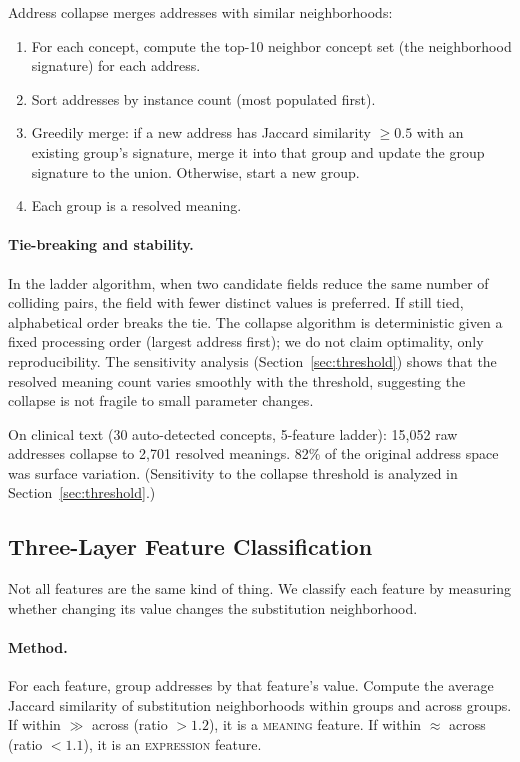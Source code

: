 \documentclass[11pt,a4paper]{article}
\begin{document}
Address collapse merges addresses with similar neighborhoods:

\begin{enumerate}
\item For each concept, compute the top-10 neighbor concept set (the neighborhood signature) for each address.
\item Sort addresses by instance count (most populated first).
\item Greedily merge: if a new address has Jaccard similarity $\geq 0.5$ with an existing group's signature, merge it into that group and update the group signature to the union. Otherwise, start a new group.
\item Each group is a resolved meaning.
\end{enumerate}

\paragraph{Tie-breaking and stability.} In the ladder algorithm, when two candidate fields reduce the same number of colliding pairs, the field with fewer distinct values is preferred. If still tied, alphabetical order breaks the tie. The collapse algorithm is deterministic given a fixed processing order (largest address first); we do not claim optimality, only reproducibility. The sensitivity analysis (Section~\ref{sec:threshold}) shows that the resolved meaning count varies smoothly with the threshold, suggesting the collapse is not fragile to small parameter changes.

On clinical text (30 auto-detected concepts, 5-feature ladder): 15,052 raw addresses collapse to 2,701 resolved meanings. 82\% of the original address space was surface variation. (Sensitivity to the collapse threshold is analyzed in Section~\ref{sec:threshold}.)

\subsection{Three-Layer Feature Classification}

Not all features are the same kind of thing. We classify each feature by measuring whether changing its value changes the substitution neighborhood.

\paragraph{Method.} For each feature, group addresses by that feature's value. Compute the average Jaccard similarity of substitution neighborhoods within groups and across groups. If within $\gg$ across (ratio $> 1.2$), it is a \textsc{meaning} feature. If within $\approx$ across (ratio $< 1.1$), it is an \textsc{expression} feature.
\end{document}
